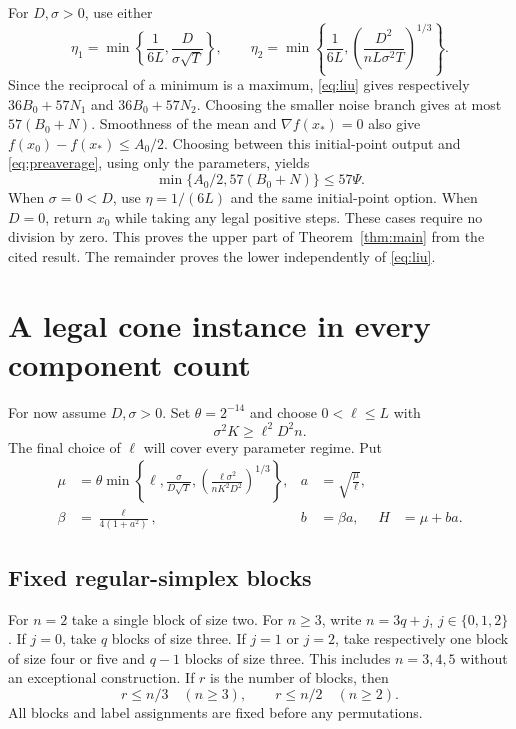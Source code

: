 \documentclass[11pt]{article}
\theoremstyle{remark}
\begin{document}
For $D,\sigma>0$, use either
\[
 \eta_1=\min\!\left\{\frac1{6L},\frac{D}{\sigma\sqrt T}\right\},
 \qquad
 \eta_2=\min\!\left\{\frac1{6L},
       \left(\frac{D^2}{nL\sigma^2T}\right)^{1/3}\right\}.
\]
Since the reciprocal of a minimum is a maximum, \eqref{eq:liu}
gives respectively $36B_0+57N_1$ and $36B_0+57N_2$. Choosing the
smaller noise branch gives at most $57(B_0+N)$. Smoothness of the mean
and $\nabla f(x_*)=0$ also give
$f(x_0)-f(x_*)\le A_0/2$. Choosing between this initial-point output
and \eqref{eq:preaverage}, using only the parameters, yields
\[
 \min\{A_0/2,57(B_0+N)\}\le57\Psi.
\]
When $\sigma=0<D$, use $\eta=1/(6L)$ and the same initial-point
option. When $D=0$, return $x_0$ while taking any legal positive steps.
These cases require no division by zero. This proves the upper part of
Theorem~\ref{thm:main} from the cited result. The remainder proves the
lower independently of \eqref{eq:liu}.

\section{A legal cone instance in every component count}

For now assume $D,\sigma>0$. Set $\theta=2^{-14}$ and choose
$0<\ell\le L$ with
\begin{equation}\label{eq:scale-condition}
 \sigma^2K\ge\ell^2D^2n.
\end{equation}
The final choice of $\ell$ will cover every parameter regime. Put
\begin{align}
 \mu&=\theta\min\!\left\{\ell,\frac{\sigma}{D\sqrt T},
       \left(\frac{\ell\sigma^2}{nK^2D^2}\right)^{1/3}\right\},
 &a&=\sqrt{\frac\mu\ell},\label{eq:mu}\\
 \beta&=\frac{\ell}{4(1+a^2)},&
 b&=\beta a,& H&=\mu+ba.\label{eq:coefficients}
\end{align}

\subsection{Fixed regular-simplex blocks}
For $n=2$ take a single block of size two. For $n\ge3$, write
$n=3q+j$, $j\in\{0,1,2\}$. If $j=0$, take $q$ blocks of size
three. If $j=1$ or $j=2$, take respectively one block of size four or
five and $q-1$ blocks of size three. This includes $n=3,4,5$ without
an exceptional construction. If $r$ is the number of blocks, then
\begin{equation}\label{eq:block-count}
 r\le n/3\quad(n\ge3),\qquad r\le n/2\quad(n\ge2).
\end{equation}
All blocks and label assignments are fixed before any permutations.
\end{document}
